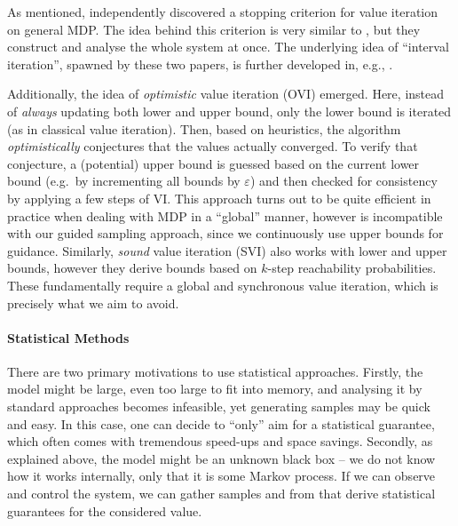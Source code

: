 \documentclass{theoretics}
\begin{document}
As mentioned, \cite{DBLP:conf/rp/HaddadM14} independently discovered a stopping criterion for value iteration on general MDP.
The idea behind this criterion is very similar to \cite{DBLP:conf/atva/BrazdilCCFKKPU14}, but they construct and analyse the whole system at once.
The underlying idea of \enquote{interval iteration}, spawned by these two papers, is further developed in, e.g., \cite{DBLP:conf/cav/Baier0L0W17,DBLP:journals/tcs/HaddadM18,DBLP:conf/lics/AshokCKWW20}.

Additionally, the idea of \emph{optimistic} value iteration (OVI) \cite{DBLP:conf/cav/HartmannsK20,DBLP:conf/atva/AzeemEKSW22} emerged.
Here, instead of \emph{always} updating both lower and upper bound, only the lower bound is iterated (as in classical value iteration).
Then, based on heuristics, the algorithm \emph{optimistically} conjectures that the values actually converged.
To verify that conjecture, a (potential) upper bound is guessed based on the current lower bound (e.g.\ by incrementing all bounds by $\varepsilon$) and then checked for consistency by applying a few steps of VI.
This approach turns out to be quite efficient in practice when dealing with MDP in a \enquote{global} manner, however is incompatible with our guided sampling approach, since we continuously use upper bounds for guidance.
Similarly, \emph{sound} value iteration (SVI) \cite{DBLP:conf/cav/QuatmannK18} also works with lower and upper bounds, however they derive bounds based on $k$-step reachability probabilities.
These fundamentally require a global and synchronous value iteration, which is precisely what we aim to avoid.


\paragraph{Statistical Methods}
There are two primary motivations to use statistical approaches.
Firstly, the model might be large, even too large to fit into memory, and analysing it by standard approaches becomes infeasible, yet generating samples may be quick and easy.
In this case, one can decide to \enquote{only} aim for a statistical guarantee, which often comes with tremendous speed-ups and space savings.
Secondly, as explained above, the model might be an unknown black box -- we do not know how it works internally, only that it is some Markov process.
If we can observe and control the system, we can gather samples and from that derive statistical guarantees for the considered value.
\end{document}
